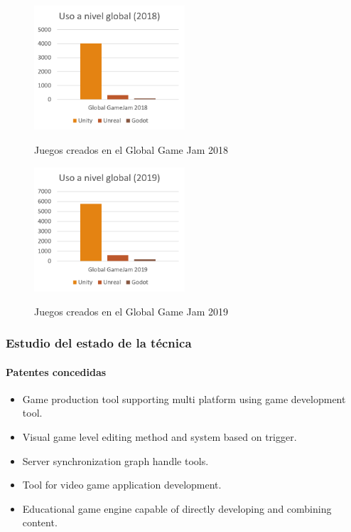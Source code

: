 \documentclass[]{article}
\begin{document}
\begin{figure}[H]
	
	\centering
	\includegraphics[width=0.5\textwidth]{GGJ}
	\caption{Juegos creados en el Global Game Jam 2018} \cite{GGJ2018} 
	\label{GGJ2018}
	
\end{figure}

\begin{figure}[H]
	
	\centering
	\includegraphics[width=0.5\textwidth]{GGJ2019}
	\caption{Juegos creados en el Global Game Jam 2019} \cite{GGJ2019} 
	\label{GGJ2019}
	
\end{figure}

\subsubsection{Estudio del estado de la t\'ecnica}

\paragraph{Patentes concedidas}
\begin{itemize}
	\item Game production tool supporting multi platform using game development tool. \cite{multip}
	\item Visual game level editing method and system based on trigger. \cite{leveledit}
	\item Server synchronization graph handle tools. \cite{Server}
	\item Tool for video game application development. \cite{EA}
	\item Educational game engine capable of directly developing and combining content. \cite{Edu}
\end{itemize}
\end{document}
